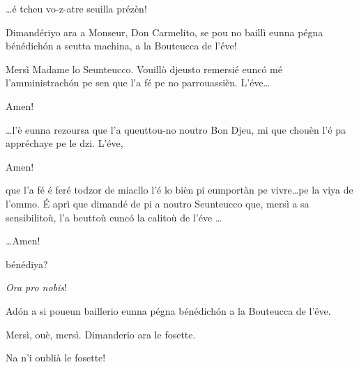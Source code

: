 \begin{drama}
\Seunteuccospeaks \ldots é tcheu vo-z-atre seuilla prézèn!


\Seunteuccospeaks Dimandériyo ara a Monseur, Don Carmelito, se pou no baillì eunna pégna bénédich\'on a seutta machina, a la Bouteucca  de l'éve!


\Donspeaks Mersì Madame lo Seunteucco. Vouillò djeusto remersié eunc\'o mé l'amministrach\'on pe sen que l'a fé pe no parrouassièn. L'éve\ldots

\Dzispeaks Amen!

\Donspeaks \ldots l'è eunna rezoursa que l'a queuttou-no noutro Bon Djeu, mi que chouèn l'é pa appréchaye pe le dzi. L'éve,

\Dzispeaks Amen!

\Donspeaks que l'a fé é feré todzor de miacllo l'é lo bièn pi eumportàn pe vivre\ldots pe la viya de l’ommo. \'E aprì que dimandé de pi a noutro Seunteucco que, mersì a sa sensibilitoù, l’a beuttoù eunc\'o la calitoù de l’éve \ldots

\Dzispeaks \ldots Amen!

\Donspeaks bénédiya?

\Dzispeaks \textit{Ora pro nobis}!


\Donspeaks Ad\'on a si poueun baillerio eunna pégna bénédich\'on a la Bouteucca de l'éve.


\Seunteuccospeaks{} Mersì, ouè, mersì.  Dimanderio ara le fosette\forbici .

\Valletspeaks{} Na n'i oublià le fosette!



\end{drama}
